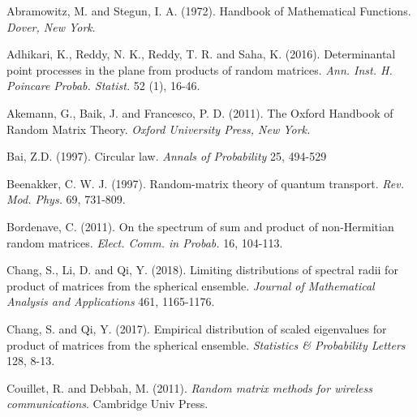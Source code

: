 \documentclass[11pt]{article}
\numberwithin{equation}{section}
\begin{document}
\begin{thebibliography}{AA} %

Abramowitz, M. and Stegun, I. A. (1972). Handbook of Mathematical
Functions. {\it Dover, New York}.


Adhikari, K., Reddy,  N. K., Reddy, T. R. and Saha, K. (2016).
Determinantal point processes in the plane from products of random
matrices. {\it Ann. Inst. H. Poincare Probab. Statist.} 52 (1),
16-46.



Akemann, G., Baik, J. and Francesco, P. D. (2011). The Oxford
Handbook of Random Matrix Theory.  {\it Oxford University Press, New
York.}


Bai, Z.D. (1997). Circular law.  {\it Annals of Probability} 25,
494-529







Beenakker, C. W. J. (1997). Random-matrix theory of quantum
transport. {\it Rev. Mod. Phys.} 69, 731-809.


Bordenave, C. (2011). On the spectrum of sum and product of
non-Hermitian random matrices. {\it Elect. Comm. in Probab.} 16,
104-113.

Chang, S., Li, D. and Qi, Y. (2018).  Limiting distributions of
spectral radii for product of matrices from the spherical ensemble.
 {\it Journal of Mathematical Analysis and Applications} 461, 1165-1176.


Chang, S. and Qi, Y. (2017). Empirical distribution of scaled
eigenvalues for product of matrices from the spherical ensemble.
{\it Statistics \& Probability Letters} 128, 8-13.



Couillet, R.  and Debbah, M. (2011). {\it Random matrix methods for
wireless communications}. Cambridge Univ Press.


\end{thebibliography}
\end{document}
